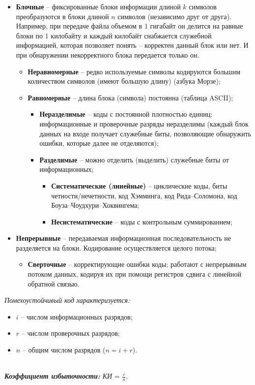 \begin{itemize}
\item \textbf{Блочные} -- фиксированные блоки информации длиной $k$ символов преобразуются в блоки длиной $n$ символов (независимо друг от друга). Например, при передаче файла объемом в 1 гигабайт он делится на равные блоки по 1 килобайту и каждый килобайт снабжается служебной информацией, которая позволяет понять -- корректен данный блок или нет. И при обнаружении некорректного блока передается только он.
    \begin{itemize}
      \item \textbf{Неравномерные} -- редко используемые символы кодируются большим количеством символов (имеют большую длину) (азбука Морзе);
      \item \textbf{Равномерные} -- длина блока (символа) постоянна (таблица ASCII);
      \begin{itemize}
        \item \textbf{Неразделимые} -- коды с постоянной плотностью единиц: информационные и проверочные разряды неразделимы (каждый блок данных на входе получает служебные биты, позволяющие обнаружить ошибки, которые далее не отделяются);
        \item \textbf{Разделимые} -- можно отделить (выделить) служебные биты от информационных;
        \begin{itemize}
          \item \textbf{Систематические (линейные)} -- циклические коды, биты четности/нечетности, код Хэмминга, код Рида--Соломона, код Боуза--Чоудхури--Хоквингема;
          \item \textbf{Несистематические} -- коды с контрольным суммированием;
        \end{itemize}
      \end{itemize}
    \end{itemize}
\item \textbf{Непрерывные} -- передаваемая информационная последовательность не разделяется на блоки. Кодирование осуществляется целого потока;
    \begin{itemize}
     \item \textbf{Сверточные} -- корректирующие ошибки коды; работают с непрерывным потоком данных, кодируя их при помощи регистров сдвига с линейной обратной связью.
     \end{itemize}
\end{itemize}
\begin{center}
\emph{Помехоустойчивый код характеризуется:}
\end{center}
\begin{itemize}
\item$i$ -- числом информационных разрядов;
\item$r$ -- числом проверочных разрядов;
\item$n$ -- общим числом разрядов ($n = i + r$).
\\\\
\end{itemize}
\emph{\textbf{Коэффициент избыточности:} КИ} = $\frac{r}{n}$.


